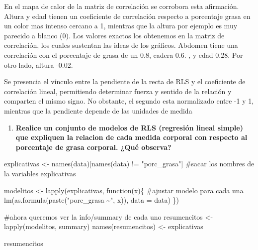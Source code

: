 \documentclass[
  letterpaper,
  DIV=11,
  numbers=noendperiod]{scrartcl}
\newenvironment{Shaded}{\begin{snugshade}}{\end{snugshade}}
\newcommand{\AttributeTok}[1]{\textcolor[rgb]{0.40,0.45,0.13}{#1}}
\newcommand{\CommentTok}[1]{\textcolor[rgb]{0.37,0.37,0.37}{#1}}
\newcommand{\ControlFlowTok}[1]{\textcolor[rgb]{0.00,0.23,0.31}{#1}}
\newcommand{\FunctionTok}[1]{\textcolor[rgb]{0.28,0.35,0.67}{#1}}
\newcommand{\NormalTok}[1]{\textcolor[rgb]{0.00,0.23,0.31}{#1}}
\newcommand{\OtherTok}[1]{\textcolor[rgb]{0.00,0.23,0.31}{#1}}
\newcommand{\SpecialCharTok}[1]{\textcolor[rgb]{0.37,0.37,0.37}{#1}}
\newcommand{\StringTok}[1]{\textcolor[rgb]{0.13,0.47,0.30}{#1}}
\providecommand{\tightlist}{%
  \setlength{\itemsep}{0pt}\setlength{\parskip}{0pt}}\usepackage{longtable,booktabs,array}
\begin{document}
En el mapa de calor de la matriz de correlación se corrobora esta
afirmación. Altura y edad tienen un coeficiente de correlación respecto
a porcentaje grasa en un color mas intenso cercano a 1, mientras que la
altura por ejemplo es muy parecido a blanco (0). Los valores exactos los
obtenemos en la matriz de correlación, los cuales sustentan las ideas de
los gráficos. Abdomen tiene una correlación con el porcentaje de grasa
de un 0.8, cadera 0.6. , y edad 0.28. Por otro lado, altura -0.02.

Se presencia el vínculo entre la pendiente de la recta de RLS y el
coeficiente de correlación lineal, permitiendo determinar fuerza y
sentido de la relación y comparten el mismo signo. No obstante, el
segundo esta normalizado entre -1 y 1, mientras que la pendiente depende
de las unidades de medida

\begin{enumerate}
\def\labelenumi{\arabic{enumi}.}
\setcounter{enumi}{3}
\tightlist
\item
  \textbf{Realice un conjunto de modelos de RLS (regresión lineal
  simple) que expliquen la relacion de cada medida corporal con respecto
  al porcentaje de grasa corporal. ¿Qué observa?}
\end{enumerate}

\begin{Shaded}
\begin{Highlighting}[]
\NormalTok{explicativas }\OtherTok{\textless{}{-}} \FunctionTok{names}\NormalTok{(data)[}\FunctionTok{names}\NormalTok{(data) }\SpecialCharTok{!=} \StringTok{"porc\_grasa"}\NormalTok{]}
\CommentTok{\#sacar los nombres de la variables explicativas}

\NormalTok{modelitos }\OtherTok{\textless{}{-}} \FunctionTok{lapply}\NormalTok{(explicativas, }
      \ControlFlowTok{function}\NormalTok{(x)\{ }\CommentTok{\#ajustar modelo para cada una}
        \FunctionTok{lm}\NormalTok{(}\FunctionTok{as.formula}\NormalTok{(}\FunctionTok{paste}\NormalTok{(}\StringTok{"porc\_grasa \textasciitilde{}"}\NormalTok{, x)), }\AttributeTok{data =}\NormalTok{ data)}
\NormalTok{      \})}

\CommentTok{\#ahora queremos ver la info/summary de cada uno}
\NormalTok{resumencitos }\OtherTok{\textless{}{-}} \FunctionTok{lapply}\NormalTok{(modelitos, summary)}
\FunctionTok{names}\NormalTok{(resumencitos) }\OtherTok{\textless{}{-}}\NormalTok{ explicativas}

\NormalTok{resumencitos}
\end{Highlighting}
\end{Shaded}
\end{document}
